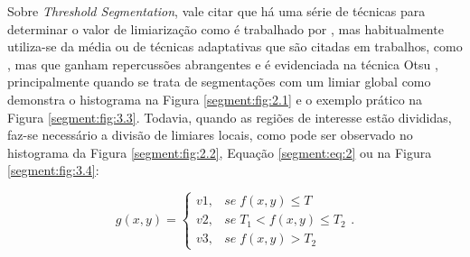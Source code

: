 Sobre \textit{Threshold Segmentation}, vale citar que há uma série de técnicas para determinar o valor de limiarização como é trabalhado por \cite{Al-amri2010}, mas habitualmente utiliza-se da média \citep{Al-amri2010, Yanowitz1989, Yuheng2017} ou de técnicas adaptativas que são citadas em trabalhos, como \cite{Yanowitz1989}, mas que ganham repercussões abrangentes e é evidenciada na técnica Otsu \citep{Otsu1979}, principalmente quando se trata de segmentações com um limiar global como demonstra o histograma na Figura \ref{segment:fig:2.1} e o exemplo prático na Figura  \ref{segment:fig:3.3}. Todavia, quando as regiões de interesse estão divididas, faz-se necessário a divisão de limiares locais, como pode ser observado no histograma da Figura \ref{segment:fig:2.2}, Equação \ref{segment:eq:2} ou na Figura \ref{segment:fig:3.4}:

\begin{equation}
\label{segment:eq:2}
    g(x,y) = \begin{cases}
        v1, & se \; f(x,y) \leq T \\ 
        v2, & se \; T_1 < f(x,y) \leq T_2 \\
        v3, & se \; f(x,y) > T_2
    \end{cases}.
\end{equation}

